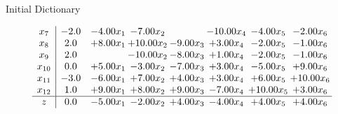 \documentclass[8pt]{article}
\begin{document}
Initial Dictionary 

\[\begin{array}{c| c c@{\hskip 2pt} c@{\hskip 2pt} c@{\hskip 2pt} c@{\hskip 2pt} c@{\hskip 2pt} c@{\hskip 2pt} }
 x_{7}   &  -2.0 & -4.00 x_{1} & -7.00 x_{2} &   & -10.00 x_{4} & -4.00 x_{5} & -2.00 x_{6}\\
 x_{8}   &  2.0 & +  8.00 x_{1} & + 10.00 x_{2} & -9.00 x_{3} & +  3.00 x_{4} & -2.00 x_{5} & -1.00 x_{6}\\
 x_{9}   &  2.0  &   & -10.00 x_{2} & -8.00 x_{3} & +  1.00 x_{4} & -2.00 x_{5} & -1.00 x_{6}\\
 x_{10}   &  0.0 & +  5.00 x_{1} & -3.00 x_{2} & -7.00 x_{3} & +  3.00 x_{4} & -5.00 x_{5} & +  9.00 x_{6}\\
 x_{11}   &  -3.0 & -6.00 x_{1} & +  7.00 x_{2} & +  4.00 x_{3} & +  3.00 x_{4} & +  6.00 x_{5} & + 10.00 x_{6}\\
 x_{12}   &  1.0 & +  9.00 x_{1} & +  8.00 x_{2} & +  9.00 x_{3} & -7.00 x_{4} & + 10.00 x_{5} & +  3.00 x_{6}\\
\hline
z    &  0.0 & -5.00 x_{1} & -2.00 x_{2} & +  4.00 x_{3} & -4.00 x_{4} & +  4.00 x_{5} & +  4.00 x_{6}\\
\end{array}\]
\end{document}
